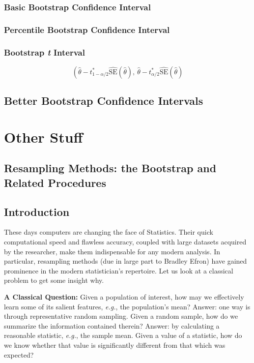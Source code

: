 \documentclass[captions=tableheading]{scrbook}
\begin{document}
\subsection{Basic Bootstrap Confidence Interval}
\label{sec-4_5_2}
\subsection{Percentile Bootstrap Confidence Interval}
\label{sec-4_5_3}
\subsection{Bootstrap \emph{t} Interval}
\label{sec-4_5_4}

\[
\left( \hat{\theta} - t_{1 - \alpha/2}^{\ast}\widehat{\mathrm{SE}}(\hat{\theta}),\  \hat{\theta} - t_{\alpha/2}^{\ast}\widehat{\mathrm{SE}}(\hat{\theta})
\]
\section{Better Bootstrap Confidence Intervals}
\label{sec-4_6}
\chapter{Other Stuff}
\label{sec-5}
\section{Resampling Methods: the Bootstrap and Related Procedures}
\label{sec-5_1}
\section{Introduction}
\label{sec-5_2}


These days computers are changing the face of Statistics. Their quick computational speed and flawless accuracy, coupled with large datasets acquired by the researcher, make them indispensable for any modern analysis. In particular, resampling methods (due in large part to Bradley Efron) have gained prominence in the modern statistician's repertoire. Let us look at a classical problem to get some insight
why.

\textbf{A Classical Question:} Given a population of interest, how may we effectively learn some of its salient features, \emph{e.g.}, the population's mean? Answer: one way is through representative random sampling. Given a random sample, how do we summarize the information contained therein? Answer: by calculating a reasonable statistic, \emph{e.g.}, the sample mean. Given a value of a statistic, how do we know whether that value is significantly different from that which was expected?
\end{document}
